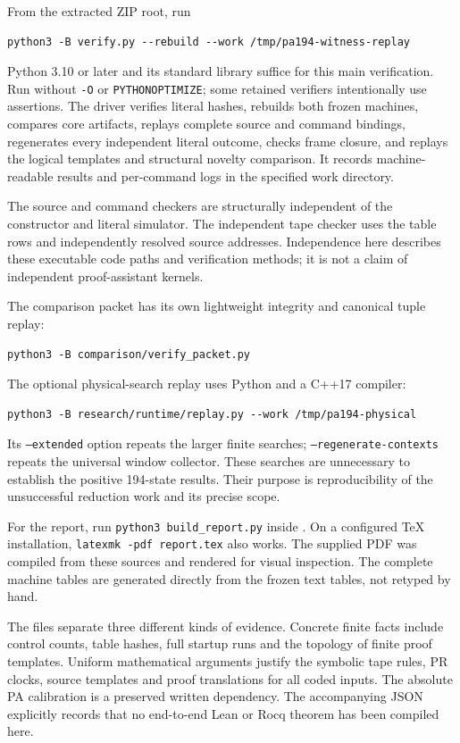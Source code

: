 From the extracted ZIP root, run
\begin{verbatim}
python3 -B verify.py --rebuild --work /tmp/pa194-witness-replay
\end{verbatim}
Python 3.10 or later and its standard library suffice for this main
verification.  Run without \texttt{-O} or \texttt{PYTHONOPTIMIZE}; some
retained verifiers intentionally use assertions.  The driver verifies
literal hashes, rebuilds both frozen machines, compares core artifacts,
replays complete source and command bindings, regenerates every independent
literal outcome, checks frame closure, and replays the logical templates
and structural novelty comparison.  It records machine-readable results
and per-command logs in the specified work directory.

The source and command checkers are structurally independent of the
constructor and literal simulator.  The independent tape checker uses
the table rows and independently resolved source addresses.  Independence
here describes these executable code paths and verification methods;
it is not a claim of independent proof-assistant kernels.

The comparison packet has its own lightweight integrity and canonical
tuple replay:
\begin{verbatim}
python3 -B comparison/verify_packet.py
\end{verbatim}
The optional physical-search replay uses Python and a C++17 compiler:
\begin{verbatim}
python3 -B research/runtime/replay.py --work /tmp/pa194-physical
\end{verbatim}
Its \texttt{--extended} option repeats the larger finite searches;
\texttt{--regenerate-contexts} repeats the universal window collector.
These searches are unnecessary to establish the positive 194-state
results.  Their purpose is reproducibility of the unsuccessful reduction
work and its precise scope.

For the report, run \texttt{python3 build\_report.py} inside
.  On a configured TeX installation,
\texttt{latexmk -pdf report.tex} also works.  The supplied PDF was compiled from these sources and
rendered for visual inspection.  The complete machine tables are
generated directly from the frozen text tables, not retyped by hand.

The files separate three different kinds of evidence.  Concrete finite
facts include control counts, table hashes, full startup runs and the
topology of finite proof templates.  Uniform mathematical arguments
justify the symbolic tape rules, PR clocks, source templates and proof
translations for all coded inputs.  The absolute PA calibration is a
preserved written dependency.  The accompanying JSON explicitly records
that no end-to-end Lean or Rocq theorem has been compiled here.
